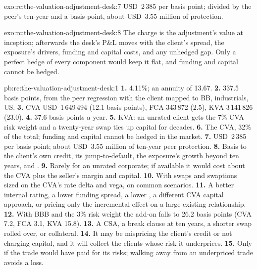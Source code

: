 \begin{solution}{exo:rc:the-valuation-adjustment-desk:7}
USD~2\,385 per basis point; divided by the peer's ten-year  and a basis point,
about USD~3.55 million of protection.
\end{solution}

\begin{solution}{exo:rc:the-valuation-adjustment-desk:8}
The charge is the adjustment's value at inception; afterwards the desk's P\&L moves with the
client's spread, the exposure's drivers, funding and capital costs, and any unhedged gap. Only a
perfect hedge of every component would keep it flat, and funding and capital cannot be hedged.
\end{solution}

\begin{solution}{pb:rc:the-valuation-adjustment-desk:1}
\textbf{1.} 4.11\%; an annuity of 13.67.
\textbf{2.} 337.5 basis points, from the peer regression with the client mapped to BB,
industrials, US.
\textbf{3.} CVA USD~1\,649\,494 (12.1 basis points), FCA 343\,872 (2.5), KVA 3\,141\,826 (23.0).
\textbf{4.} 37.6 basis points a year.
\textbf{5.} KVA: an unrated client gets the 7\% CVA risk weight and a twenty-year swap ties up
capital for decades.
\textbf{6.} The CVA, 32\% of the total; funding and capital cannot be hedged in the market.
\textbf{7.} USD~2\,385 per basis point; about USD~3.55 million of ten-year peer protection.
\textbf{8.} Basis to the client's own credit, its jump-to-default, the exposure's growth beyond
ten years, and .
\textbf{9.} Rarely for an unrated corporate; if available it would cost about the CVA plus the
seller's margin and capital.
\textbf{10.} With swaps and swaptions sized on the CVA's rate delta and vega, on common
scenarios.
\textbf{11.} A better internal rating, a lower funding spread, a lower , a
different CVA capital approach, or pricing only the incremental effect on a large existing
relationship.
\textbf{12.} With BBB and the 3\% risk weight the add-on falls to 26.2 basis points (CVA 7.2,
FCA 3.1, KVA 15.8).
\textbf{13.} A CSA, a break clause at ten years, a shorter swap rolled over, or collateral.
\textbf{14.} It may be mispricing the client's credit or not charging capital, and it will
collect the clients whose risk it underprices.
\textbf{15.} Only if the trade would have paid for its risks; walking away from an
underpriced trade avoids a loss.

\end{solution}
